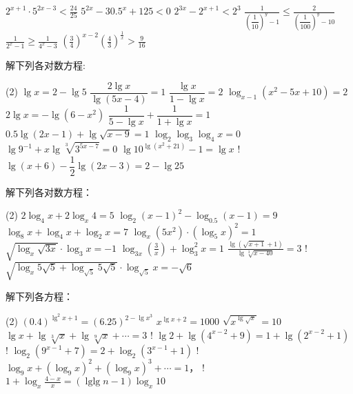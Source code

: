 \begin{Exercise}
\begin{question}
\begin{tasks}
    \task  $\displaystyle 2^{x+1} \cdot 5^{2 x-3}<\frac{24}{25}$
    \task  $\displaystyle 5^{2x}-30.5^{x}+125<0$
    \task  $\displaystyle 2^{3 x}-2^{x+1}<2^{3} $
    \task  $\displaystyle \frac{1}{\left(\dfrac{1}{10}\right)^{y}-1} \leqslant \frac{2}{\left(\dfrac{1}{100}\right)^{y}-10}$
    \task  $\displaystyle \frac{1}{2^{x}-1} \geqslant \frac{1}{4^{x}-3}$
    \task  $\displaystyle \left(\frac{3}{4}\right)^{x-2}\left(\frac{4}{3}\right)^{\tfrac{1}{x}}>\frac{9}{16}$
  \end{tasks}
  \item  解下列各对数方程:
  \begin{tasks}(2)
    \task  $\lg x=2-\lg 5$
    \task  $\dfrac{2\lg x}{\lg(5x-4)}=1$
    \task  $\dfrac{\lg x}{1-\lg x}=2$
    \task  $\log_{x-1}(x^2-5x+10)=2$
    \task  $2 \lg x=-\lg \left(6-x^{2}\right)$
    \task  $\dfrac{1}{5-\lg x}+\dfrac{1}{1+\lg x}=1$
    \task  $0.5 \lg (2 x-1)+\lg \sqrt{x-9}=1$
    \task  $\log _{2} \log _{3} \log _{4} x=0$
    \task  $\lg 9^{-1}+x \lg \sqrt[3]{3^{5 x-7}}=0$
    \task  $\lg 10^{\lg\left(x^{2}+21\right)}-1=\lg x$
    \task! $\lg(x+6)-\dfrac{1}{2}\lg(2x-3)=2-\lg 25$
  \end{tasks}
  \item 解下列各对数方程：
  \begin{tasks}(2)
    \task   $\displaystyle 2 \log _{4} x+2 \log _{x} 4=5$ 
    \task   $\displaystyle \log _{2}(x-1)^{2}-\log _{0.5}(x-1)=9$
    \task   $\displaystyle \log _{8} x+\log _{4} x+\log _{2} x=7$
    \task   $\displaystyle \log _{x}\left(5 x^{2}\right) \cdot\left(\log _{5} x\right)^{2}=1$
    \task   $\displaystyle \sqrt{\log _{x} \sqrt{3 x}} \cdot \log _{3} x=-1$
    \task   $\displaystyle \log _{3 x}\left(\frac{3}{x}\right)+\log _{3}^{2} x=1$
    \task   $\displaystyle \frac{\lg\left(\sqrt{x+1}+1\right)}{\lg\sqrt[3]{x-40}}=3$
    \task!  $\displaystyle \sqrt{\log _{x} 5 \sqrt{5}+\log _{\sqrt{5}} 5 \sqrt{5}} \cdot \log _{\sqrt{5}} x=-\sqrt{6}$
  \end{tasks}
  \item 解下列各方程：
  \begin{tasks}(2)
    \task $(0.4)^{\lg^2 x+1}=(6.25)^{2-\lg x^3}$
    \task $x^{\lg x+2}=1000$
    \task $\sqrt{x^{\lg \sqrt{x}}}=10$
    \task $\lg x+\lg \sqrt[3]{x}+\lg  \sqrt[9]{x}+\cdots=3$
    \task! $\lg 2+\lg \left(4^{x-2}+9\right)=1+\lg \left(2^{x-2}+1\right)$
    \task! $\log _{2}\left(9^{x-1}+7\right)=2+\log _{2}\left(3^{x-1}+1\right)$
    \task! $\log _{9} x+\left(\log _{9} x\right)^{2}+\left(\log _{9} x\right)^{3}+\cdots=1$，
    \task! $ 1+\log _{x} \frac{4-x}{x}=(\operatorname{lglg} n-1) \log _{x} 10$

\end{tasks}
\end{question}
\end{Exercise}

